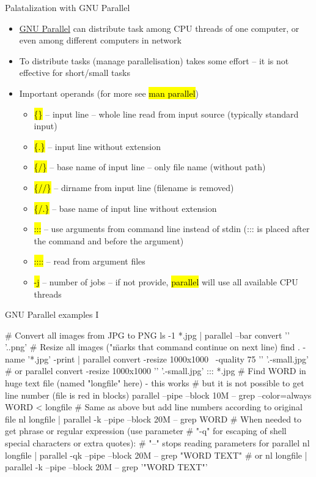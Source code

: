\documentclass[compress, ucs, xelatex, 11pt, xcolor=svgnames,
  hyperref={
    bookmarks=true,
    unicode=true,
    colorlinks=true,
    pdftitle={Linux, command line and MetaCentrum},
    plainpages=false,
    pdfauthor={Vojtech Zeisek},
    pdfsubject={Course about use of Linux command line, writing shell scripts and using MetaCentrum of CESNET},
    pdfcreator={XeLaTeX},
    pdfkeywords={Linux, GNU, BASH, shell, command line, MetaCentrum},
    linkcolor=Red,
    anchorcolor=Blue,
    citecolor=Purple,
    filecolor=DodgerBlue,
    menucolor=DarkOrchid,
    urlcolor=DeepSkyBlue,
    pdftex},
  url={hyphens, lowtilde} %
  ]{beamer}
\renewcommand{\texttt}[1]{\hl{\ttfamily #1}}
\begin{document}
\begin{frame}{Palatalization with GNU Parallel}
\begin{itemize}
  \item \href{https://www.gnu.org/software/parallel/}{GNU Parallel} can distribute task among CPU threads of one computer, or even among different computers in network
  \item To distribute tasks (manage parallelisation) takes some effort -- it is not effective for short/small tasks
  \item Important operands (for more see \texttt{man parallel})
  \begin{itemize}
    \item \texttt{\{\}} -- input line -- whole line read from input source (typically standard input)
    \item \texttt{\{.\}} -- input line without extension
    \item \texttt{\{/\}} -- base name of input line -- only file name (without path)
    \item \texttt{\{//\}} -- dirname from input line (filename is removed)
    \item \texttt{\{/.\}} -- base name of input line without extension
    \item \texttt{:::} -- use arguments from command line instead of stdin (::: is placed after the command and before the argument)
    \item \texttt{::::} -- read from argument files
    \item \texttt{-j} -- number of jobs -- if not provide, \texttt{parallel} will use all available CPU threads
  \end{itemize}
\end{itemize}
\end{frame}

\begin{frame}[fragile]{GNU Parallel examples I}
  \begin{bashcode}
    # Convert all images from JPG to PNG
    ls -1 *.jpg | parallel --bar convert '{}' '{.}.png'
    # Resize all images ("\" marks that command continue on next line)
    find . -name '*.jpg' -print | parallel convert -resize 1000x1000 \
      -quality 75 '{}' '{.}-small.jpg' # or
    parallel convert -resize 1000x1000 '{}' '{.}-small.jpg' ::: *.jpg
    # Find WORD in huge text file (named "longfile" here) - this works
    # but it is not possible to get line number (file is red in blocks)
    parallel --pipe --block 10M -- grep --color=always WORD < longfile
    # Same as above but add line numbers according to original file
    nl longfile | parallel -k --pipe --block 20M -- grep WORD
    # When needed to get phrase or regular expression (use parameter
    # "-q" for escaping of shell special characters or extra quotes):
    # "--" stops reading parameters for parallel
    nl longfile | parallel -qk --pipe --block 20M -- grep "WORD TEXT" # or
    nl longfile | parallel -k --pipe --block 20M -- grep '"WORD TEXT"'
  \end{bashcode}
\end{frame}
\end{document}
